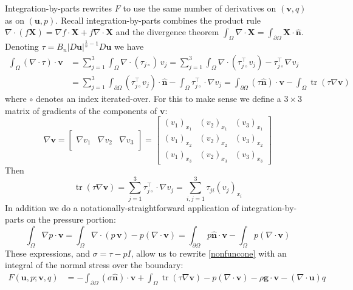 \documentclass[letterpaper,final,12pt,reqno]{amsart}
\newcommand{\grad}{\nabla}
\newcommand{\trace}{\operatorname{tr}}
\newcommand{\hbn}{\hat{\mathbf{n}}}
\newcommand{\bu}{\mathbf{u}}
\newcommand{\bv}{\mathbf{v}}
\newcommand{\bX}{\mathbf{X}}
\begin{document}
Integration-by-parts rewrites $F$ to use the same number of derivatives on $(\bv,q)$ as on $(\bu,p)$.  Recall integration-by-parts combines the product rule $\nabla \cdot(f\bX) = \grad f\cdot \bX + f \nabla \cdot \bX$ and the divergence theorem $\int_\Omega \nabla \cdot \bX = \int_{\partial \Omega} \bX \cdot \hbn$.  Denoting $\tau = B_n |D\bu|^{\frac{1}{n} - 1} D\bu$ we have
\begin{align*}
\int_\Omega \left(\nabla \cdot \tau\right)\cdot \bv &= \sum_{j=1}^3 \int_\Omega \nabla \cdot (\tau_{j\circ})\, v_j = \sum_{j=1}^3 \int_\Omega \nabla \cdot (\tau_{j\circ}^\top v_j) - \tau_{j\circ}^\top \nabla v_j \\
  &= \sum_{j=1}^3 \int_{\partial \Omega} (\tau_{j\circ}^\top v_j) \cdot \hbn - \int_\Omega \tau_{j\circ}^\top \cdot \nabla v_j = \int_{\partial \Omega} (\tau \hbn)\cdot \bv - \int_\Omega \trace(\tau \nabla \bv)
\end{align*}
where $\circ$ denotes an index iterated-over.  For this to make sense we define a $3\times 3$ matrix of gradients of the components of $\bv$:
\newcommand{\trefthree}[3]{\left[\begin{array}{c|c|c} & & \\ #1 & #2 & #3 \\ & & \end{array}\right]}
    $$\grad \bv = \trefthree{\grad v_1}{\grad v_2}{\grad v_3} = \begin{bmatrix}
    (v_1)_{x_1} & (v_2)_{x_1} & (v_3)_{x_1} \\
    (v_1)_{x_2} & (v_2)_{x_2} & (v_3)_{x_2} \\
    (v_1)_{x_3} & (v_2)_{x_3} & (v_3)_{x_3}
    \end{bmatrix}$$
Then
    $$\trace(\tau \grad \bv) = \sum_{j=1}^3 \tau_{j\circ}^\top \cdot \grad v_j = \sum_{i,j=1}^3 \tau_{ji} (v_j)_{x_i}$$
In addition we do a notationally-straightforward application of integration-by-parts on the pressure portion:
    $$\int_\Omega \nabla p \cdot \bv = \int_\Omega \nabla\cdot (p\,\bv) - p (\nabla \cdot \bv) = \int_{\partial \Omega} p\hbn \cdot \bv - \int_\Omega p (\nabla \cdot \bv)$$
These expressions, and $\sigma=\tau-pI$, allow us to rewrite \eqref{nonfuncone} with an integral of the normal stress over the boundary:
\begin{align}
F(\bu,p;\bv,q) &= -\int_{\partial\Omega} (\sigma \hbn)\cdot \bv + \int_\Omega \trace(\tau \nabla \bv) - p (\nabla \cdot \bv) - \rho \mathbf{g} \cdot \bv - \left(\nabla \cdot \bu\right) q \label{nonfunctwo}
\end{align}
\end{document}
